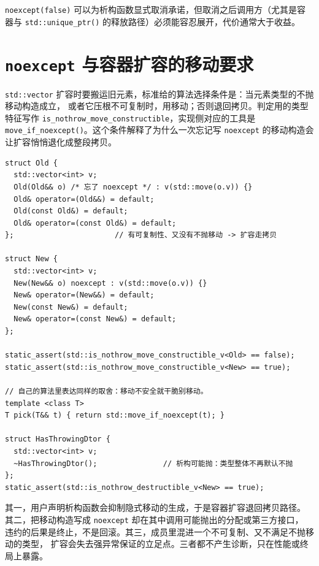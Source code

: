 \documentclass[12pt,a4paper,fontset=fandol]{ctexbook}
\newcommand{\Fn}[1]{\texttt{#1()}}
\newcommand{\Tp}[1]{\texttt{#1}}
\newcommand{\Bk}{\discretionary{}{}{}}
\begin{document}
\Tp{noexcept(false)} 可以为析构函数显式取消承诺，但取消之后调用方（尤其是容器与
\Fn{std::unique{\Bk}\_ptr} 的释放路径）必须能容忍展开，代价通常大于收益。

\section{\Tp{noexcept} 与容器扩容的移动要求}\label{sec:ub11-vector-growth}

\Tp{std::vector} 扩容时要搬运旧元素，标准给的算法选择条件是：当元素类型的不抛移动构造成立，
或者它压根不可复制时，用移动；否则退回拷贝。判定用的类型特征写作
\Tp{is{\Bk}\_nothrow{\Bk}\_move{\Bk}\_constructible}，实现侧对应的工具是
\Fn{move{\Bk}\_if{\Bk}\_noexcept}。这个条件解释了为什么一次忘记写 \Tp{noexcept}
的移动构造会让扩容悄悄退化成整段拷贝。

\begin{lstlisting}[style=cppstyle, caption={移动承诺决定扩容用搬还是拷；隐式承诺由成员推导}]
struct Old {
  std::vector<int> v;
  Old(Old&& o) /* 忘了 noexcept */ : v(std::move(o.v)) {}
  Old& operator=(Old&&) = default;
  Old(const Old&) = default;
  Old& operator=(const Old&) = default;
};                       // 有可复制性、又没有不抛移动 -> 扩容走拷贝

struct New {
  std::vector<int> v;
  New(New&& o) noexcept : v(std::move(o.v)) {}
  New& operator=(New&&) = default;
  New(const New&) = default;
  New& operator=(const New&) = default;
};

static_assert(std::is_nothrow_move_constructible_v<Old> == false);
static_assert(std::is_nothrow_move_constructible_v<New> == true);

// 自己的算法里表达同样的取舍：移动不安全就干脆别移动。
template <class T>
T pick(T&& t) { return std::move_if_noexcept(t); }

struct HasThrowingDtor {
  std::vector<int> v;
  ~HasThrowingDtor();               // 析构可能抛：类型整体不再默认不抛
};
static_assert(std::is_nothrow_destructible_v<New> == true);
\end{lstlisting}

\begin{warning}[title={三个会静默拆掉承诺的动作}]
其一，用户声明析构函数会抑制隐式移动的生成，于是容器扩容退回拷贝路径。
其二，把移动构造写成 \Tp{noexcept} 却在其中调用可能抛出的分配或第三方接口，
违约的后果是终止，不是回滚。其三，成员里混进一个不可复制、又不满足不抛移动的类型，
扩容会失去强异常保证的立足点。三者都不产生诊断，只在性能或终局上暴露。
\end{warning}
\end{document}
